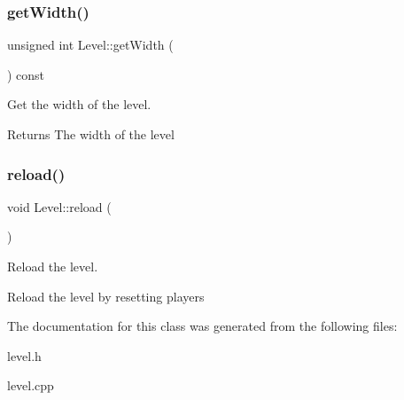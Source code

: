 \subsubsection{\texorpdfstring{get\+Width()}{getWidth()}}
{\footnotesize\ttfamily unsigned int Level\+::get\+Width (\begin{DoxyParamCaption}{ }\end{DoxyParamCaption}) const}



Get the width of the level. 

\begin{DoxyReturn}{Returns}
The width of the level 
\end{DoxyReturn}
\mbox{\label{classLevel_a9a1fb164259e6a8c91410ed992a8b878}} 
\subsubsection{\texorpdfstring{reload()}{reload()}}
{\footnotesize\ttfamily void Level\+::reload (\begin{DoxyParamCaption}{ }\end{DoxyParamCaption})}



Reload the level. 

Reload the level by resetting players 

The documentation for this class was generated from the following files\+:\begin{DoxyCompactItemize}
\item 
level.\+h\item 
level.\+cpp\end{DoxyCompactItemize}
